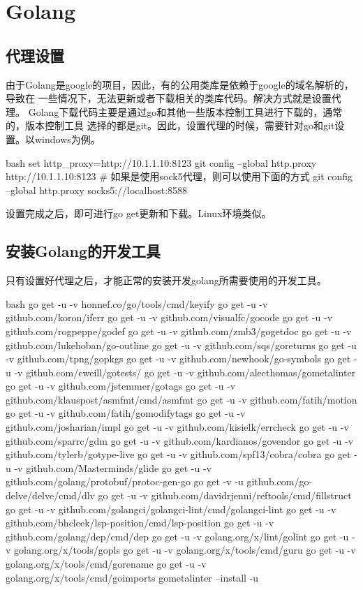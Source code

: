 \chapter{Golang}

\section{代理设置}
由于Golang是google的项目，因此，有的公用类库是依赖于google的域名解析的，导致在
一些情况下，无法更新或者下载相关的类库代码。解决方式就是设置代理。
Golang下载代码主要是通过go和其他一些版本控制工具进行下载的，通常的，版本控制工具
选择的都是git。因此，设置代理的时候，需要针对go和git设置。以windows为例。
\begin{code-block}{bash}
set http_proxy=http://10.1.1.10:8123
git config --global http.proxy http://10.1.1.10:8123
# 如果是使用sock5代理，则可以使用下面的方式
git config --global http.proxy socks5://localhost:8588
\end{code-block}

设置完成之后，即可进行go get更新和下载。Linux环境类似。

\section{安装Golang的开发工具}
只有设置好代理之后，才能正常的安装开发golang所需要使用的开发工具。
\begin{code-block}{bash}
go get -u -v honnef.co/go/tools/cmd/keyify
go get -u -v github.com/koron/iferr
go get -u -v github.com/visualfc/gocode
go get -u -v github.com/rogpeppe/godef
go get -u -v github.com/zmb3/gogetdoc
go get -u -v github.com/lukehoban/go-outline
go get -u -v github.com/sqs/goreturns
go get -u -v github.com/tpng/gopkgs
go get -u -v github.com/newhook/go-symbols
go get -u -v github.com/cweill/gotests/
go get -u -v github.com/alecthomas/gometalinter
go get -u -v github.com/jstemmer/gotags
go get -u -v github.com/klauspost/asmfmt/cmd/asmfmt
go get -u -v github.com/fatih/motion
go get -u -v github.com/fatih/gomodifytags
go get -u -v github.com/josharian/impl
go get -u -v github.com/kisielk/errcheck
go get -u -v github.com/sparrc/gdm
go get -u -v github.com/kardianos/govendor
go get -u -v github.com/tylerb/gotype-live
go get -u -v github.com/spf13/cobra/cobra
go get -u -v github.com/Masterminds/glide
go get -u -v github.com/golang/protobuf/protoc-gen-go
go get -v -u github.com/go-delve/delve/cmd/dlv
go get -u -v github.com/davidrjenni/reftools/cmd/fillstruct
go get -u -v github.com/golangci/golangci-lint/cmd/golangci-lint
go get -u -v github.com/bhcleek/lsp-position/cmd/lsp-position
go get -u -v github.com/golang/dep/cmd/dep
go get -u -v golang.org/x/lint/golint
go get -u -v golang.org/x/tools/gopls
go get -u -v golang.org/x/tools/cmd/guru
go get -u -v golang.org/x/tools/cmd/gorename
go get -u -v golang.org/x/tools/cmd/goimports
gometalinter --install -u
\end{code-block}

